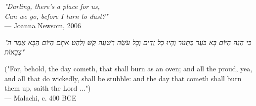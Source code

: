 \begin{flushright}
\emph{"Darling, there's a place for us,\\
Can we go, before I turn to dust?"}\\
— Joanna Newsom, 2006
\end{flushright}

\vspace{2em}

\begin{flushright}
\begin{hebrew}
\emph{"כִּי הִנֵּה הַיּוֹם בָּא בֹּעֵר כַּתַּנּוּר וְהָיוּ כָל זֵדִים וְכָל עֹשֵׂה רִשְׁעָה קַשׁ וְלִהַט אֹתָם הַיּוֹם הַבָּא אָמַר ה צְבָאוֹת"} \\
\end{hebrew}
("For, behold, the day cometh, that shall burn as an oven; and all the proud, yea, and all that do wickedly, shall be stubble: and the day that cometh shall burn them up, saith the Lord ...") \\
— Malachi, c. 400 BCE
\end{flushright}
